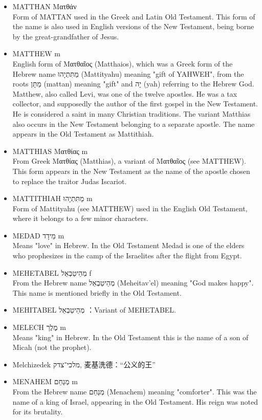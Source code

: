 \begin{itemize}
\item MATTHAN Ματθάν \\
Form of MATTAN used in the Greek and Latin Old Testament. This form of the name is also used in English versions of the New Testament, being borne by the great-grandfather of Jesus.
\item MATTHEW m \\
English form of Ματθαῖος (Matthaios), which was a Greek form of the Hebrew name מַתִּתְיָהוּ (Mattityahu) meaning "gift of YAHWEH", from the roots מַתָּן (mattan) meaning "gift" and יָה (yah) referring to the Hebrew God. Matthew, also called Levi, was one of the twelve apostles. He was a tax collector, and supposedly the author of the first gospel in the New Testament. He is considered a saint in many Christian traditions. The variant Matthias also occurs in the New Testament belonging to a separate apostle. The name appears in the Old Testament as Mattithiah.
\item MATTHIAS Ματθίας m \\
From Greek Ματθίας (Matthias), a variant of Ματθαῖος (see MATTHEW). This form appears in the New Testament as the name of the apostle chosen to replace the traitor Judas Iscariot. 
\item MATTITHIAH מַתִּתְיָהוּ m \\
Form of Mattityahu (see MATTHEW) used in the English Old Testament, where it belongs to a few minor characters.
\item MEDAD מֵידָד m \\
Means "love" in Hebrew. In the Old Testament Medad is one of the elders who prophesizes in the camp of the Israelites after the flight from Egypt.
\item MEHETABEL מְהֵיטַבְאֵל f \\
From the Hebrew name מְהֵיטַבְאֵל (Meheitav'el) meaning "God makes happy". This name is mentioned briefly in the Old Testament.
\item MEHITABEL מְהֵיטַבְאֵל ：Variant of MEHETABEL.
\item MELECH מֶלֶך m \\
Means "king" in Hebrew. In the Old Testament this is the name of a son of Micah (not the prophet).
\item Melchizedek  מלכי־צדק‎, 麦基洗德：“公义的王”
\item MENAHEM מְנַחֵם m \\
From the Hebrew name מְנַחֵם (Menachem) meaning "comforter". This was the name of a king of Israel, appearing in the Old Testament. His reign was noted for its brutality.

\end{itemize}
